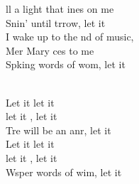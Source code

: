 \documentclass[12pt]{article}
\begin{document}
\begin{multicols*}{2}
\begin{cancion}
	ll a light that ines on me\\
	Snin' until trrow, let it  \\
	I wake up to the nd of music, \\
	Mer Mary ces to me\\
	Spking words of wom, let it  \\\jump\\
	\begin{chorus}%
	Let it  let it \\
	let it , let it \\
	Tre will be an anr, let it \\
\jump
	Let it  let it \\
	let it , let it \\
	Wsper words of wim, let it \\
	\end{chorus}%
	\jump\\
\end{cancion}%


\end{multicols*}
\end{document}
